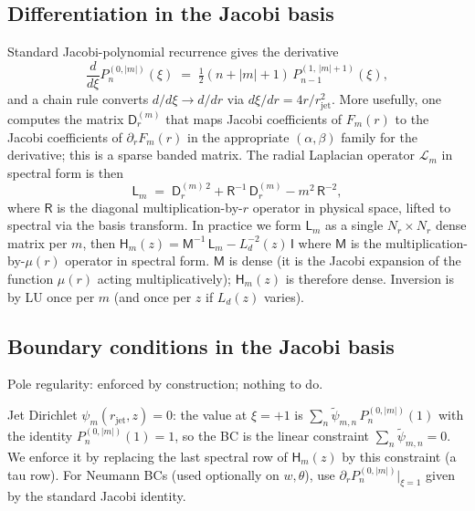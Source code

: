 \documentclass[11pt]{article}
\newcommand{\Ld}{L_d}
\newcommand{\rjet}{r_{\mathrm{jet}}}
\begin{document}
\subsection{Differentiation in the Jacobi basis}

Standard Jacobi-polynomial recurrence gives the derivative
\begin{equation}
  \frac{d}{d\xi} P_{n}^{(0,|m|)}(\xi)
  \;=\; \tfrac{1}{2}(n + |m| + 1)\,P_{n-1}^{(1,\,|m|+1)}(\xi),
\end{equation}
and a chain rule converts $d/d\xi \to d/dr$ via
$d\xi/dr = 4r/\rjet^{2}$.  More usefully, one computes the matrix
$\mathsf{D}_{r}^{(m)}$ that maps Jacobi coefficients of $F_{m}(r)$ to
the Jacobi coefficients of $\partial_{r}F_{m}(r)$ in the appropriate
$(\alpha,\beta)$ family for the derivative; this is a sparse
banded matrix.  The radial Laplacian operator $\mathcal{L}_{m}$ in
spectral form is then
\begin{equation}
  \mathsf{L}_{m}
  \;=\; \mathsf{D}_{r}^{(m)\,2}
  + \mathsf{R}^{-1}\,\mathsf{D}_{r}^{(m)}
  - m^{2}\,\mathsf{R}^{-2},
  \label{eq:Lm-spectral}
\end{equation}
where $\mathsf{R}$ is the diagonal multiplication-by-$r$ operator in
physical space, lifted to spectral via the basis transform.  In
practice we form $\mathsf{L}_{m}$ as a single $N_{r} \times N_{r}$
dense matrix per $m$, then $\mathsf{H}_{m}(z) = \mathsf{M}^{-1}\,
\mathsf{L}_{m} - \Ld^{-2}(z)\,\mathsf{I}$ where $\mathsf{M}$ is the
multiplication-by-$\mu(r)$ operator in spectral form.  $\mathsf{M}$
is dense (it is the Jacobi expansion of the function $\mu(r)$ acting
multiplicatively); $\mathsf{H}_{m}(z)$ is therefore dense.  Inversion
is by LU once per $m$ (and once per $z$ if $\Ld(z)$ varies).

\subsection{Boundary conditions in the Jacobi basis}

Pole regularity: enforced by construction; nothing to do.

Jet Dirichlet $\psi_{m}(\rjet, z) = 0$: the value at $\xi = +1$ is
$\sum_{n} \widetilde{\psi}_{m,n}\,P_{n}^{(0,|m|)}(1)$ with the
identity $P_{n}^{(0,|m|)}(1) = 1$, so the BC is the linear constraint
$\sum_{n} \widetilde{\psi}_{m,n} = 0$.  We enforce it by replacing the
last spectral row of $\mathsf{H}_{m}(z)$ by this constraint (a tau
row).  For Neumann BCs (used optionally on $w, \theta$), use
$\partial_{r} P_{n}^{(0,|m|)}|_{\xi=1}$ given by the standard Jacobi
identity.
\end{document}
